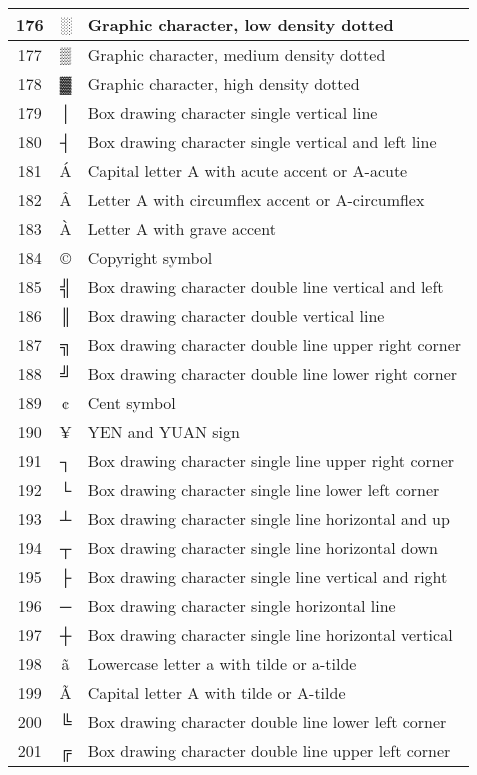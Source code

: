 {\begin{center}
\begin{longtable}{|c|c|l|}
176 & ░ & Graphic character, low density dotted \\\hline
177 & ▒ & Graphic character, medium density dotted \\\hline
178 & ▓ & Graphic character, high density dotted \\\hline
179 & │ & Box drawing character single vertical line \\\hline
180 & ┤ & Box drawing character single vertical and left line \\\hline
181 & Á & Capital letter A with acute accent or A-acute \\\hline
182 & Â & Letter A with circumflex accent or A-circumflex \\\hline
183 & À & Letter A with grave accent \\\hline
184 & © & Copyright symbol \\\hline
185 & ╣ & Box drawing character double line vertical and left \\\hline
186 & ║ & Box drawing character double vertical line \\\hline
187 & ╗ & Box drawing character double line upper right corner \\\hline
188 & ╝ & Box drawing character double line lower right corner \\\hline
189 & ¢ & Cent symbol \\\hline
190 & ¥ & YEN and YUAN sign \\\hline
191 & ┐ & Box drawing character single line upper right corner \\\hline
192 & └ & Box drawing character single line lower left corner \\\hline
193 & ┴ & Box drawing character single line horizontal and up \\\hline
194 & ┬ & Box drawing character single line horizontal down \\\hline
195 & ├ & Box drawing character single line vertical and right \\\hline
196 & ─ & Box drawing character single horizontal line \\\hline
197 & ┼ & Box drawing character single line horizontal vertical \\\hline
198 & ã & Lowercase letter a with tilde or a-tilde \\\hline
199 & Ã & Capital letter A with tilde or A-tilde \\\hline
200 & ╚ & Box drawing character double line lower left corner \\\hline
201 & ╔ & Box drawing character double line upper left corner \\\hline

\end{longtable}
\end{center}}

